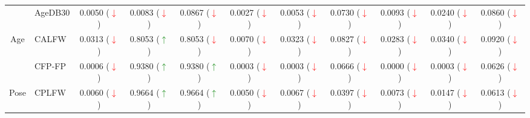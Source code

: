 \documentclass[class=report, crop=false, a4paper, 12pt]{standalone}
\begin{document}
\begin{table}[H]
{\begin{tabular}{cl|ccc|ccc|ccc|}
    \multicolumn{1}{|c|}{}                          & AgeDB30  & \multicolumn{1}{c|}{{\color[HTML]{333333} 0.0050 (\textcolor{red}{$\downarrow$})}} & \multicolumn{1}{c|}{{\color[HTML]{333333} 0.0083 (\textcolor{red}{$\downarrow$})}} & {\color[HTML]{333333} 0.0867 (\textcolor{red}{$\downarrow$})} & \multicolumn{1}{c|}{0.0027 (\textcolor{red}{$\downarrow$})} & \multicolumn{1}{c|}{0.0053 (\textcolor{red}{$\downarrow$})} & 0.0730 (\textcolor{red}{$\downarrow$}) & \multicolumn{1}{c|}{0.0093 (\textcolor{red}{$\downarrow$})} & \multicolumn{1}{c|}{0.0240 (\textcolor{red}{$\downarrow$})} & 0.0860 (\textcolor{red}{$\downarrow$}) \\ \cline{2-11} 
    \multicolumn{1}{|c|}{\multirow{-2}{*}{Age}}     & CALFW    & \multicolumn{1}{c|}{{\color[HTML]{333333} 0.0313 (\textcolor{red}{$\downarrow$})}} & \multicolumn{1}{c|}{{\color[HTML]{333333} 0.8053 (\textcolor{green}{$\uparrow$})}} & {\color[HTML]{333333} 0.8053 (\textcolor{red}{$\downarrow$})} & \multicolumn{1}{c|}{0.0070 (\textcolor{red}{$\downarrow$})} & \multicolumn{1}{c|}{0.0323 (\textcolor{red}{$\downarrow$})} & 0.0827 (\textcolor{red}{$\downarrow$}) & \multicolumn{1}{c|}{0.0283 (\textcolor{red}{$\downarrow$})} & \multicolumn{1}{c|}{0.0340 (\textcolor{red}{$\downarrow$})} & 0.0920 (\textcolor{red}{$\downarrow$}) \\ \hline
    \multicolumn{1}{|c|}{}                          & CFP-FP   & \multicolumn{1}{c|}{{\color[HTML]{333333} 0.0006 (\textcolor{red}{$\downarrow$})}} & \multicolumn{1}{c|}{{\color[HTML]{333333} 0.9380 (\textcolor{green}{$\uparrow$})}} & {\color[HTML]{333333} 0.9380 (\textcolor{green}{$\uparrow$})} & \multicolumn{1}{c|}{0.0003 (\textcolor{red}{$\downarrow$})} & \multicolumn{1}{c|}{0.0003 (\textcolor{red}{$\downarrow$})} & 0.0666 (\textcolor{red}{$\downarrow$}) & \multicolumn{1}{c|}{0.0000 (\textcolor{red}{$\downarrow$})} & \multicolumn{1}{c|}{0.0003 (\textcolor{red}{$\downarrow$})} & 0.0626 (\textcolor{red}{$\downarrow$}) \\ \cline{2-11} 
    \multicolumn{1}{|c|}{\multirow{-2}{*}{Pose}}    & CPLFW    & \multicolumn{1}{c|}{{\color[HTML]{333333} 0.0060 (\textcolor{red}{$\downarrow$})}} & \multicolumn{1}{c|}{{\color[HTML]{333333} 0.9664 (\textcolor{green}{$\uparrow$})}} & {\color[HTML]{333333} 0.9664 (\textcolor{green}{$\uparrow$})} & \multicolumn{1}{c|}{0.0050 (\textcolor{red}{$\downarrow$})}  & \multicolumn{1}{c|}{0.0067 (\textcolor{red}{$\downarrow$})} & 0.0397 (\textcolor{red}{$\downarrow$}) & \multicolumn{1}{c|}{0.0073 (\textcolor{red}{$\downarrow$})} & \multicolumn{1}{c|}{0.0147 (\textcolor{red}{$\downarrow$})} & 0.0613 (\textcolor{red}{$\downarrow$}) \\ \hline

\end{tabular}}
\end{table}
\end{document}

